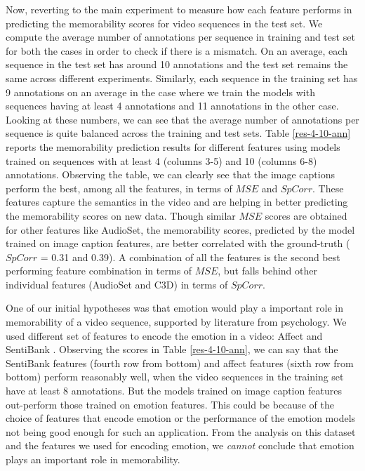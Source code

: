 \documentclass[sigconf]{acmart}
\begin{document}
Now, reverting to the main experiment to measure how each feature performs in predicting the memorability scores for video sequences in the test set. 
We compute the average number of annotations per sequence in training and test set for both the cases in order to check if there is a mismatch.
On an average, each sequence in the test set has around 10 annotations and the test set remains the same across different experiments.
Similarly, each sequence in the training set has 9 annotations on an average in the case where we train the models with sequences having at least 4 annotations and 11 annotations in the other case.
Looking at these numbers, we can see that the average number of annotations per sequence is quite balanced across the training and test sets.
Table \ref{res-4-10-ann} reports the memorability prediction results for different features using models trained on sequences with at least 4 (columns 3-5) and 10 (columns 6-8) annotations.
Observing the table, we can clearly see that the image captions perform the best, among all the features, in terms of $MSE$ and $SpCorr$.
These features capture the semantics in the video and are helping in better predicting the memorability scores on new data.
Though similar $MSE$ scores are obtained for other features like AudioSet, the memorability scores, predicted by the model trained on image caption features, are better correlated with the ground-truth ($SpCorr$ = 0.31 and 0.39). 
A combination of all the features is the second best performing feature combination in terms of $MSE$, but falls behind other individual features (AudioSet and C3D) in terms of $SpCorr$.

One of our initial hypotheses was that emotion would play a important role in memorability of a video sequence, supported by literature from psychology.
We used different set of features to encode the emotion in a video: Affect \cite{affect} and SentiBank \cite{sb-feat}.
Observing the scores in Table \ref{res-4-10-ann}, we can say that the SentiBank features (fourth row from bottom) and affect features (sixth row from bottom) perform reasonably well, when the video sequences in the training set have at least 8 annotations. 
But the models trained on image caption features out-perform those trained on emotion features.
This could be because of the choice of features that encode emotion or the performance of the emotion models not being good enough for such an application.
From the analysis on this dataset and the features we used for encoding emotion, we \emph{cannot} conclude that emotion plays an important role in memorability.
\end{document}
